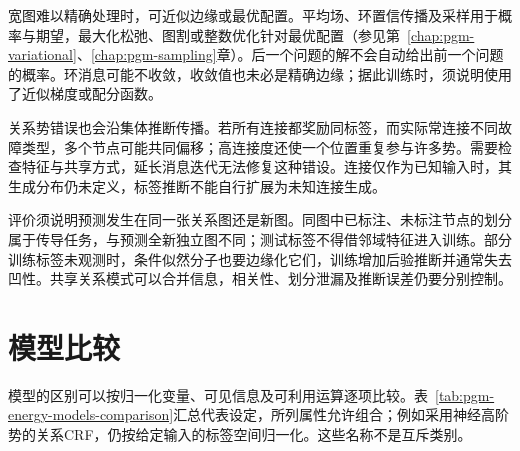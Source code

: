 宽图难以精确处理时，可近似边缘或最优配置。平均场、环置信传播及采样用于概率与期望，最大化松弛、图割或整数优化针对最优配置（参见第~\ref{chap:pgm-variational}、\ref{chap:pgm-sampling}章）。后一个问题的解不会自动给出前一个问题的概率。环消息可能不收敛，收敛值也未必是精确边缘；据此训练时，须说明使用了近似梯度或配分函数。

关系势错误也会沿集体推断传播。若所有连接都奖励同标签，而实际常连接不同故障类型，多个节点可能共同偏移；高连接度还使一个位置重复参与许多势。需要检查特征与共享方式，延长消息迭代无法修复这种错设。连接仅作为已知输入时，其生成分布仍未定义，标签推断不能自行扩展为未知连接生成。

评价须说明预测发生在同一张关系图还是新图。同图中已标注、未标注节点的划分属于传导任务，与预测全新独立图不同；测试标签不得借邻域特征进入训练。部分训练标签未观测时，条件似然分子也要边缘化它们，训练增加后验推断并通常失去凹性。共享关系模式可以合并信息，相关性、划分泄漏及推断误差仍要分别控制。

\section{模型比较}
\label{sec:pgm-energy-models-comparison}

模型的区别可以按归一化变量、可见信息及可利用运算逐项比较。表~\ref{tab:pgm-energy-models-comparison}汇总代表设定，所列属性允许组合；例如采用神经高阶势的关系CRF，仍按给定输入的标签空间归一化。这些名称不是互斥类别。

